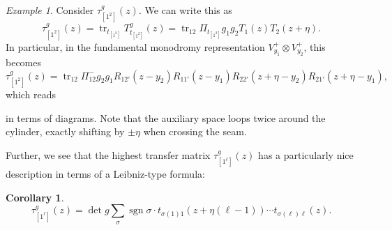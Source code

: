 \documentclass[11pt]{report}
\newtheorem{corollary}[theorem]{Corollary}
\theoremstyle{definition}
\theoremstyle{remark}
\theoremstyle{remark}
\newtheorem*{example}{Example}
\begin{document}
\begin{example}
Consider $\tau_{[1^2]}^g(z)$. We can write this as
\begin{equation*}
\tau_{[1^2]}^g(z) = \operatorname{tr}_{t_{[1^2]}} T_{t_{[1^2]}}^g(z) = \operatorname{tr}_{12} \Pi_{t_{[1^2]}} g_1 g_2 T_1(z) T_2(z+\eta).
\end{equation*}
In particular, in the fundamental monodromy representation $V_{y_1}^+ \otimes V_{y_2}^+$, this becomes
\begin{equation*}
\tau_{[1^2]}^g(z) = \operatorname{tr}_{12} \Pi_{12}^- g_2 g_1 R_{12'}(z-y_2) R_{11'}(z-y_1) R_{22'}(z+\eta-y_2) R_{21'}(z+\eta-y_1),
\end{equation*}
which reads
~\\
\begin{center}
\end{center}
in terms of diagrams. Note that the auxiliary space loops twice around the cylinder, exactly shifting by $\pm \eta$ when crossing the seam.
\end{example}

Further, we see that the highest transfer matrix $\tau_{[1^\ell]}^g(z)$ has a particularly nice description in terms of a Leibniz-type formula:

\begin{corollary}
\begin{equation*}
\tau_{[1^\ell]}^g(z) = \det g \sum_\sigma \operatorname{sgn} \sigma \cdot t_{\sigma(1)1}(z+\eta(\ell-1)) \cdots t_{\sigma(\ell)\ell}(z).
\end{equation*}
\end{corollary}
\end{document}
